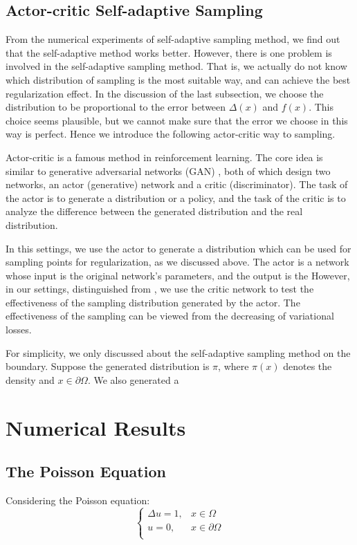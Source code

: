 \documentclass{article}
\begin{document}
\subsection{Actor-critic Self-adaptive Sampling}
\par From the numerical experiments of self-adaptive sampling method, we find out that the self-adaptive method works better. However, there is one problem is involved in the self-adaptive sampling method. That is, we actually do not know which distribution of sampling is the most suitable way, and can achieve the best regularization effect. In the discussion of the last subsection, we choose the distribution to be proportional to the error between $\Delta(x)$ and $f(x)$. This choice seems plausible, but we cannot make sure that the error we choose in this way is perfect. Hence we introduce the following actor-critic way to sampling.
\par Actor-critic \cite{konda2000actor} is a famous method in reinforcement learning. The core idea is similar to generative adversarial networks (GAN) \cite{goodfellow2014generative}, both of which design two networks, an actor (generative) network and a critic (discriminator). The task of the actor is to generate a distribution or a policy, and the task of the critic is to analyze the difference between the generated distribution and the real distribution.
\par In this settings, we use the actor to generate a distribution which can be used for sampling points for regularization, as we discussed above. The actor is a network whose input is the original network's parameters, and the output is the  However, in our settings, distinguished from \cite{goodfellow2014generative} \cite{konda2000actor}, we use the critic network to test the effectiveness of the sampling distribution generated by the actor. The effectiveness of the sampling can be viewed from the decreasing of variational losses. 
\par For simplicity, we only discussed about the self-adaptive sampling method on the boundary. Suppose the generated distribution is $\pi$, where $\pi(x)$ denotes the density and $x\in\partial\Omega$. We also generated a 

\section{Numerical Results}

\subsection{The Poisson Equation}
\par Considering the Poisson equation:
\begin{equation}
\left\{
\begin{aligned}
 \Delta u=1,& x\in \Omega \\
 u=0, &x\in \partial \Omega \\
 \end{aligned}
\right.
\end{equation}
\end{document}
